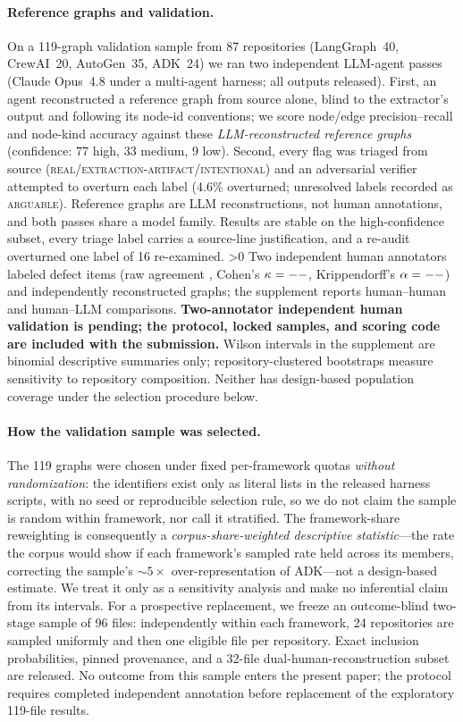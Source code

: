 \paragraph{Reference graphs and validation.}
On a 119-graph validation sample from 87 repositories (LangGraph~40, CrewAI~20,
AutoGen~35, ADK~24) we ran two independent LLM-agent passes (Claude Opus~4.8
under a multi-agent harness; all outputs released). First, an agent
reconstructed a reference graph from source alone, blind to the extractor's
output and following its node-id conventions; we score node/edge
precision--recall and node-kind accuracy against these \emph{LLM-reconstructed
reference graphs} (confidence: 77 high, 33 medium, 9 low). Second, every flag was
triaged from source
(\textsc{real}/\textsc{extraction-artifact}/\textsc{intentional}) and an
adversarial verifier attempted to overturn each label (4.6\% overturned;
unresolved labels recorded as \textsc{arguable}). Reference graphs are LLM
reconstructions, not human annotations, and both passes share a model family.
Results are stable on the high-confidence subset, every triage label carries a
source-line justification, and a re-audit overturned one label of 16 re-examined.
\ifnum\humanNflags>0
Two independent human annotators labeled \humanNflags{} defect items
(raw agreement \humanRaw{}, Cohen's $\kappa=--$,
Krippendorff's $\alpha=--$) and independently reconstructed
\humanGraphN{} graphs; the supplement reports human--human and human--LLM
comparisons.
\else
\textbf{Two-annotator independent human validation is pending; the protocol,
locked samples, and scoring code are included with the submission.}
\fi
Wilson intervals in the supplement are binomial descriptive summaries only;
repository-clustered bootstraps measure sensitivity to repository composition.
Neither has design-based population coverage under the selection procedure
below.

\paragraph{How the validation sample was selected.}
The 119 graphs were chosen under fixed per-framework quotas \emph{without
randomization}: the identifiers exist only as literal lists in the released
harness scripts, with no seed or reproducible selection rule, so we do not claim
the sample is random within framework, nor call it stratified. The
framework-share reweighting is consequently a \emph{corpus-share-weighted
descriptive statistic}---the rate the corpus would show if each framework's
sampled rate held across its members, correcting the sample's ${\sim}5\times$
over-representation of ADK---not a design-based estimate. We treat it only as a
sensitivity analysis and make no inferential claim from its intervals.
For a prospective replacement, we freeze an outcome-blind two-stage sample of
96 files: independently within each framework, 24 repositories are sampled
uniformly and then one eligible file per repository. Exact inclusion
probabilities, pinned provenance, and a 32-file dual-human-reconstruction
subset are released. No outcome from this sample enters the present paper;
the protocol requires completed independent annotation before replacement of
the exploratory 119-file results.

